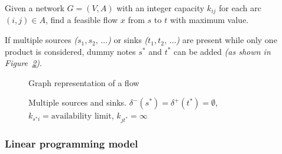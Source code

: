 \documentclass[english]{article}
\begin{document}
\begin{definition}
  Given a network \(G = \left( V, A \right)\) with an integer capacity \(k_{ij}\) for each arc \((i, j) \in A\), find a feasible flow \(x\) from \(s\) to \(t\) with maximum value.

  If multiple sources \textit{(\(s_1, s_2, \, \ldots \))} or sinks \textit{(\(t_1, t_2, \, \ldots \))} are present while only one product is considered, dummy notes \(s^\ast\) and \(t^\ast\) can be added \textit{(as shown in Figure~\ref{fig:multiple-sources-sinks})}.
  \label{def:flow-problem}
\end{definition}

\begin{figure}[htbp]
  \centering
  \bigskip
  \caption{Graph representation of a flow}
  \label{fig:flow-graph-representation}
  \bigskip
\end{figure}
\begin{figure}[htbp]
  \centering
  \bigskip
  \caption{Multiple sources and sinks. \(\delta^-(s^\ast) = \delta^+(t^\ast) = \emptyset\), \(k_{s^\ast i} = \text{availability limit}\), \(k_{jt^\ast} = \infty\)}
  \label{fig:multiple-sources-sinks}
  \bigskip
\end{figure}

\subsubsection{Linear programming model}
\end{document}

